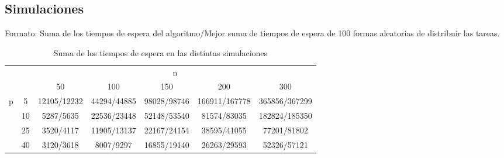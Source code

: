 \documentclass[serif,9pt]{beamer}
\begin{document}
\subsection{Simulaciones}

\begin{frame}
  Formato: Suma de los tiempos de espera del algoritmo/Mejor suma de
  tiempos de espera de 100 formas aleatorias de distribuir las tareas.
\begin{table}[H]
\centering
\caption*{Suma de los tiempos de espera en las distintas simulaciones}
\label{tabla:simulaciones}
\begin{adjustwidth}{-11.5mm}{}
\begin{tabular}{|c|c|c|c|c|c|c|}
\hline
\multicolumn{2}{|c|}{\multirow{2}{*}{}} & \multicolumn{5}{c|}{n}     \\ \cline{3-7} 
\multicolumn{2}{|c|}{}                  & 50 & 100 & 150 & 200 & 300 \\ \hline
\multirow{4}{*}{p}         & 5          & 12105/12232 & 44294/44885 & 98028/98746 & 166911/167778 & 365856/367299 \\ \cline{2-7} 
                           & 10         & 5287/5635 & 22536/23448 & 52148/53540 & 81574/83035 & 182824/185350 \\ \cline{2-7} 
                           & 25         & 3520/4117 & 11905/13137 & 22167/24154 & 38595/41055 & 77201/81802 \\ \cline{2-7} 
                           & 40         & 3120/3618 & 8007/9297 & 16855/19140 & 26263/29593 & 52326/57121 \\ \hline
\end{tabular}
\end{adjustwidth}
\end{table}
\end{frame}
\end{document}
